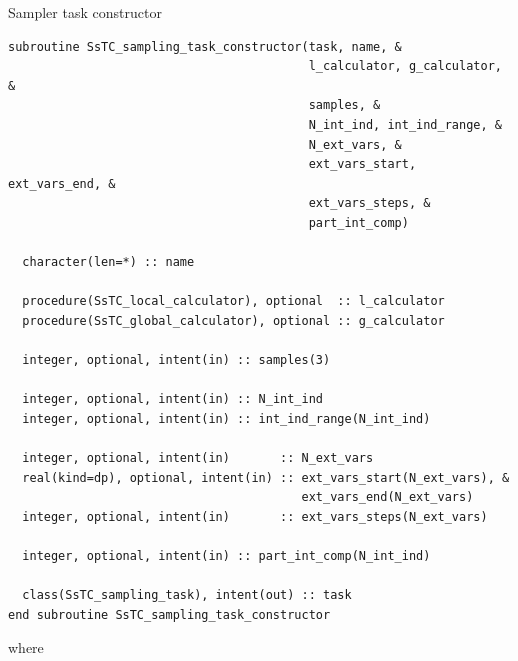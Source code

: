 \documentclass[10pt,a4paper]{article}
\begin{document}
\begin{codebox}{Sampler task constructor}
\begin{lstlisting}[caption={Interface of the ``sampler" constructor.},captionpos=b]
subroutine SsTC_sampling_task_constructor(task, name, &
                                          l_calculator, g_calculator, &
                                          samples, &
                                          N_int_ind, int_ind_range, &
                                          N_ext_vars, &
                                          ext_vars_start, ext_vars_end, &
                                          ext_vars_steps, &
                                          part_int_comp)

  character(len=*) :: name

  procedure(SsTC_local_calculator), optional  :: l_calculator
  procedure(SsTC_global_calculator), optional :: g_calculator

  integer, optional, intent(in) :: samples(3)

  integer, optional, intent(in) :: N_int_ind
  integer, optional, intent(in) :: int_ind_range(N_int_ind)

  integer, optional, intent(in)       :: N_ext_vars
  real(kind=dp), optional, intent(in) :: ext_vars_start(N_ext_vars), &
                                         ext_vars_end(N_ext_vars)
  integer, optional, intent(in)       :: ext_vars_steps(N_ext_vars)

  integer, optional, intent(in) :: part_int_comp(N_int_ind)

  class(SsTC_sampling_task), intent(out) :: task
end subroutine SsTC_sampling_task_constructor
\end{lstlisting}
\end{codebox}
where
\end{document}
